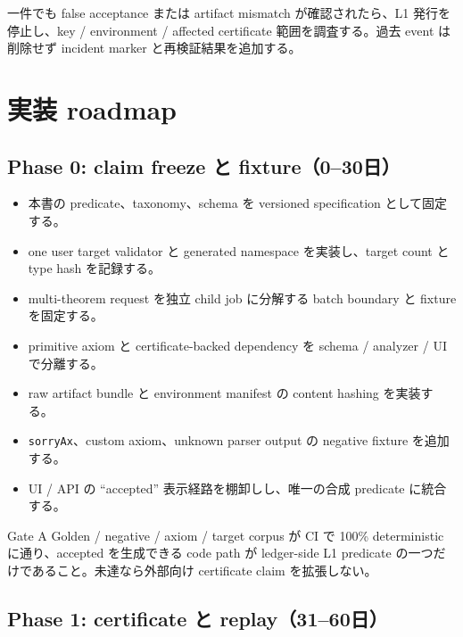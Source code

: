 \documentclass[a4paper,11pt]{ltjsarticle}
\newcommand{\code}[1]{\texttt{#1}}
\begin{document}
一件でも false acceptance または artifact mismatch が確認されたら、L1 発行を停止し、key / environment / affected
certificate 範囲を調査する。過去 event は削除せず incident marker と再検証結果を追加する。

\section{実装 roadmap}

\subsection{Phase 0: claim freeze と fixture（0--30日）}

\begin{itemize}
  \item 本書の predicate、taxonomy、schema を versioned specification として固定する。
  \item one user target validator と generated namespace を実装し、target count と type hash を記録する。
  \item multi-theorem request を独立 child job に分解する batch boundary と fixture を固定する。
  \item primitive axiom と certificate-backed dependency を schema / analyzer / UI で分離する。
  \item raw artifact bundle と environment manifest の content hashing を実装する。
  \item \code{sorryAx}、custom axiom、unknown parser output の negative fixture を追加する。
  \item UI / API の ``accepted'' 表示経路を棚卸しし、唯一の合成 predicate に統合する。
\end{itemize}

\begin{decisionbox}{Gate A}
Golden / negative / axiom / target corpus が CI で 100\% deterministic に通り、accepted を生成できる code path が
ledger-side L1 predicate の一つだけであること。未達なら外部向け certificate claim を拡張しない。
\end{decisionbox}

\subsection{Phase 1: certificate と replay（31--60日）}
\end{document}
